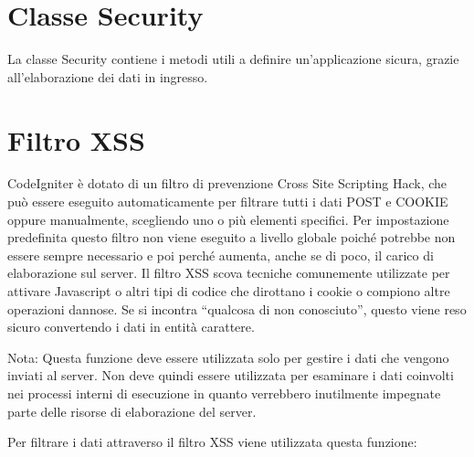\section{Classe Security}
\label{class:sicurezza}

La classe Security contiene i metodi utili a definire un'applicazione sicura, grazie all'elaborazione dei dati in ingresso.

\section*{Filtro XSS}
CodeIgniter è dotato di un filtro di prevenzione Cross Site Scripting Hack, che può essere eseguito automaticamente per filtrare tutti i dati POST e COOKIE oppure manualmente, scegliendo uno o più elementi specifici. Per impostazione predefinita questo filtro non viene eseguito a livello globale poiché potrebbe non essere sempre necessario e poi perché aumenta, anche se di poco, il carico di elaborazione sul server. Il filtro XSS scova tecniche comunemente utilizzate per attivare Javascript o altri tipi di codice che dirottano i cookie o compiono altre operazioni dannose. Se si incontra ``qualcosa di non conosciuto'', questo viene reso sicuro convertendo i dati in entità carattere.

Nota: Questa funzione deve essere utilizzata solo per gestire i dati che vengono inviati al server. Non deve quindi essere utilizzata per esaminare i dati coinvolti nei processi interni di esecuzione in quanto verrebbero inutilmente impegnate parte delle risorse di elaborazione del server.

Per filtrare i dati attraverso il filtro \ac{XSS} viene utilizzata questa funzione:

